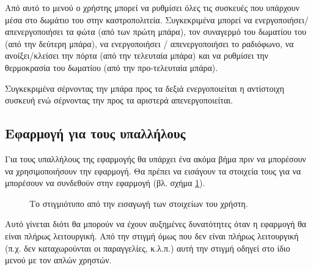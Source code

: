 \documentclass{assignment}
\begin{document}
Από αυτό το μενού ο χρήστης μπορεί να ρυθμίσει όλες τις συσκευές που υπάρχουν μέσα στο δωμάτιο του στην καστροπολιτεία. Συγκεκριμένα μπορεί να ενεργοποιήσει/απενεργοποιήσει τα φώτα (από των πρώτη μπάρα), τον συναγερμό του δωματίου του (από την δεύτερη μπάρα), να ενεργοποιήσει / απενεργοποιήσει το ραδιόφωνο, να ανοίξει/κλείσει την πόρτα (από την τελευταία μπάρα) και να ρυθμίσει την θερμοκρασία του δωματίου (από την προ-τελευταία μπάρα).

Συγκεκριμένα σέρνοντας την μπάρα προς τα δεξιά ενεργοποιείται η αντίστοιχη συσκευή ενώ σέρνοντας την προς τα αριστερά απενεργοποιείται.


\subsection{Εφαρμογή για τους υπαλλήλους}

Για τους υπαλλήλους της εφαρμογής θα υπάρχει ένα ακόμα βήμα πριν να μπορέσουν να χρησιμοποιήσουν την εφαρμογή. Θα πρέπει να εισάγουν τα στοιχεία τους για να μπορέσουν να συνδεθούν στην εφαρμογή (βλ. σχήμα \ref{fig:admin}).

\begin{figure}
\begin{center}
\caption{Το στιγμιότυπο από την εισαγωγή των στοιχείων του χρήστη.}
\label{fig:admin}
\end{center}
\end{figure}

Αυτό γίνεται διότι θα μπορούν να έχουν αυξημένες δυνατότητες όταν η εφαρμογή θα είναι πλήρως λειτουργική. Από την στιγμή όμως που δεν είναι πλήρως λειτουργική (π.χ. δεν καταχωρούνται οι παραγγελίες, κ.λ.π.) αυτή την στιγμή οδηγεί στο ίδιο μενού με τον απλών χρηστών.
\end{document}
